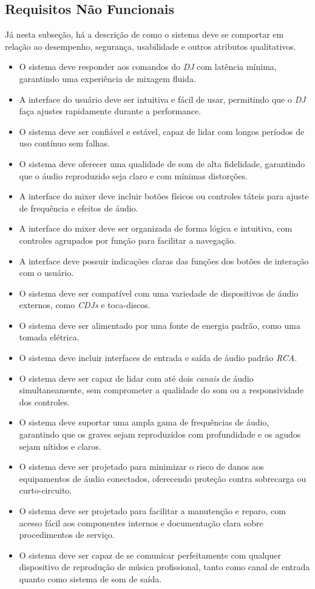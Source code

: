 \subsection{Requisitos Não Funcionais}
Já nesta subseção, há a descrição de como o sistema deve se comportar em relação ao desempenho, segurança, usabilidade e outros atributos qualitativos.  
\begin{itemize}
    \item O sistema deve responder aos comandos do \textit{DJ} com latência mínima, garantindo uma experiência de mixagem fluida.
    \item A interface do usuário deve ser intuitiva e fácil de usar, permitindo que o \textit{DJ} faça ajustes rapidamente durante a performance.
    \item O sistema deve ser confiável e estável, capaz de lidar com longos períodos de uso contínuo sem falhas.
    \item O sistema deve oferecer uma qualidade de som de alta fidelidade, garantindo que o áudio reproduzido seja claro e com mínimas distorções.
    \item A interface do mixer deve incluir botões físicos ou controles táteis para ajuste de frequência e efeitos de áudio.
    \item A interface do mixer deve ser organizada de forma lógica e intuitiva, com controles agrupados por função para facilitar a navegação.
    \item A interface deve possuir indicações claras das funções dos botões de interação com o usuário.
    \item O sistema deve ser compatível com uma variedade de dispositivos de áudio externos, como \textit{CDJs} e toca-discos.
    \item O sistema deve ser alimentado por uma fonte de energia padrão, como uma tomada elétrica.
    \item O sistema deve incluir interfaces de entrada e saída de áudio padrão \textit{RCA}.
    \item O sistema deve ser capaz de lidar com até dois \textit{canais} de áudio simultaneamente, sem comprometer a qualidade do som ou a responsividade dos controles.
    \item O sistema deve suportar uma ampla gama de frequências de áudio, garantindo que os graves sejam reproduzidos com profundidade e os agudos sejam nítidos e claros.
    \item O sistema deve ser projetado para minimizar o risco de danos aos equipamentos de áudio conectados, oferecendo proteção contra sobrecarga ou curto-circuito.
    \item O sistema deve ser projetado para facilitar a manutenção e reparo, com acesso fácil aos componentes internos e documentação clara sobre procedimentos de serviço.
    \item O sistema deve ser capaz de se comunicar perfeitamente com qualquer dispositivo de reprodução de música profissional, tanto como canal de entrada quanto como sistema de som de saída.
\end{itemize}



